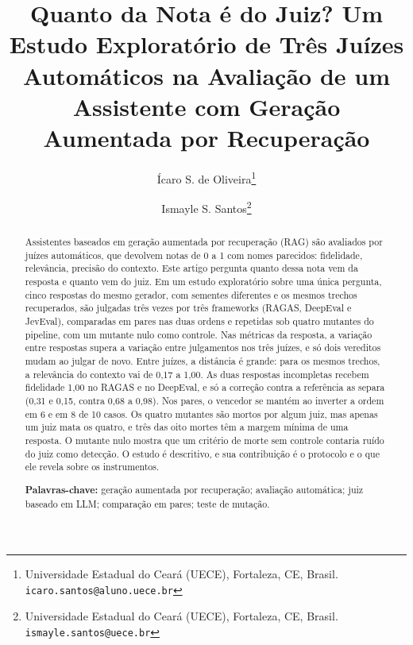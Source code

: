 \documentclass[12pt]{article}
\title{Quanto da Nota é do Juiz? Um Estudo Exploratório de Três Juízes
Automáticos na Avaliação de um Assistente com Geração Aumentada por Recuperação}
\author{Ícaro S. de Oliveira\thanks{Universidade Estadual do Ceará (UECE),
Fortaleza, CE, Brasil. \texttt{icaro.santos@aluno.uece.br}} \and
Ismayle S. Santos\thanks{Universidade Estadual do Ceará (UECE), Fortaleza, CE,
Brasil. \texttt{ismayle.santos@uece.br}}}
\date{}
\begin{document}
\maketitle

\begin{abstract}
\noindent
Assistentes baseados em geração aumentada por recuperação (RAG) são avaliados
por juízes automáticos, que devolvem notas de 0 a 1 com nomes parecidos:
fidelidade, relevância, precisão do contexto. Este artigo pergunta quanto dessa
nota vem da resposta e quanto vem do juiz. Em um estudo exploratório sobre uma
única pergunta, cinco respostas do mesmo gerador, com sementes diferentes e os
mesmos trechos recuperados, são julgadas três vezes por três frameworks (RAGAS,
DeepEval e JevEval), comparadas em pares nas duas ordens e repetidas sob quatro
mutantes do pipeline, com um mutante nulo como controle. Nas métricas da
resposta, a variação entre respostas supera a variação entre julgamentos nos
três juízes, e só dois vereditos mudam ao julgar de novo. Entre juízes, a
distância é grande: para os mesmos trechos, a relevância do contexto vai de 0,17
a 1,00. As duas respostas incompletas recebem fidelidade 1,00 no RAGAS e no
DeepEval, e só a correção contra a referência as separa (0,31 e 0,15, contra
0,68 a 0,98). Nos pares, o vencedor se mantém ao inverter a ordem em 6 e em 8 de
10 casos. Os quatro mutantes são mortos por algum juiz, mas apenas um juiz mata
os quatro, e três das oito mortes têm a margem mínima de uma resposta. O mutante
nulo mostra que um critério de morte sem controle contaria ruído do juiz como
detecção. O estudo é descritivo, e sua contribuição é o protocolo e o que ele
revela sobre os instrumentos.

\medskip
\noindent\textbf{Palavras-chave:} geração aumentada por recuperação; avaliação
automática; juiz baseado em LLM; comparação em pares; teste de mutação.
\end{abstract}
\end{document}
